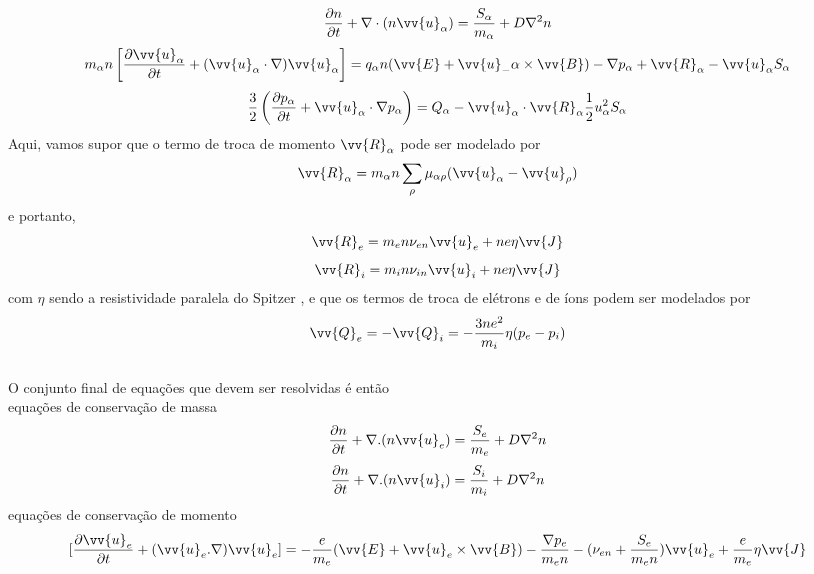 \documentclass[12pt,oneside,a4paper]{abntex2}
\begin{document}
\begin{equation}
\frac{\partial n}{\partial t} + \nabla \cdot (n \vv{u}_\alpha) = \frac{S_\alpha}{m_\alpha}+D\nabla^2 n
\end{equation}
\begin{equation}
m_\alpha n \left[ \frac{\partial \vv{u}_\alpha}{\partial t} + (\vv{u}_\alpha \cdot \nabla)\vv{u}_\alpha \right] =  q_\alpha n (\vv{E}+\vv{u}_-\alpha \times \vv{B}) - \nabla p_\alpha + \vv{R}_\alpha - \vv{u}_\alpha S_\alpha 
\end{equation}
\begin{equation} 
\frac{3}{2} \left( \frac{\partial p_\alpha}{\partial t} + \vv{u}_\alpha \cdot \nabla p_\alpha \right) =Q_\alpha -\vv{u}_\alpha \cdot \vv{R}_\alpha \frac{1}{2} u^2_\alpha S_\alpha
\end{equation}
Aqui, vamos supor que o termo de troca de momento $\vv{R}_\alpha$ pode ser modelado por
\begin{equation}
\vv{R}_\alpha = m_\alpha n \sum_\rho  \mu_{\alpha \rho}(\vv{u}_\alpha - \vv{u}_\rho)
\end{equation}
e portanto,
\begin{equation}
\vv{R}_e = m_e n \nu_{en}\vv{u}_e+ne\eta \vv{J}
\end{equation}
\begin{equation}
\vv{R}_i = m_i n \nu_{in}\vv{u}_i+ne\eta \vv{J}
\end{equation}
com $\eta$ sendo a resistividade paralela do Spitzer \cite[2.16]{tokamaks}, e que os termos de troca de elétrons e de íons podem ser modelados por
\begin{equation}
\vv{Q}_e = -\vv{Q}_i = -\frac{3ne^2}{m_i} \eta (p_e-p_i)
\end{equation}
\\
O conjunto final de equações que devem ser resolvidas é então\\
equações de conservação de massa
\begin{equation}
\label{eq: pit1}
\frac{\partial n}{\partial t} + \nabla.(n \vv{u}_e) = \frac{S_e}{m_e}+D\nabla^2 n
\end{equation}
\begin{equation} 
\label{eq: pit2}
\frac{\partial n}{\partial t} + \nabla.(n \vv{u}_i) = \frac{S_i}{m_i}+D\nabla^2 n
\end{equation}
equações de conservação de momento
\begin{equation}
\label{eq: pit51}
[\frac{\partial \vv{u}_e}{\partial t} + (\vv{u}_e . \nabla)\vv{u}_e] = - \frac{e}{m_e} (\vv{E}+\vv{u}_e \times \vv{B}) - \frac{\nabla p_e}{m_e n} - (\nu_{en}+\frac{S_e}{m_e n})\vv{u}_e + \frac{e}{m_e}\eta \vv{J} 
\end{equation}
\end{document}
